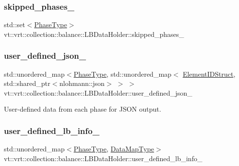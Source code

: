 \subsubsection{\texorpdfstring{skipped\+\_\+phases\+\_\+}{skipped\_phases\_}}
{\footnotesize\ttfamily std\+::set$<$\hyperlink{namespacevt_a46ce6733d5cdbd735d561b7b4029f6d7}{Phase\+Type}$>$ vt\+::vrt\+::collection\+::balance\+::\+L\+B\+Data\+Holder\+::skipped\+\_\+phases\+\_\+}

\mbox{\label{structvt_1_1vrt_1_1collection_1_1balance_1_1_l_b_data_holder_a38dc8aada18756357212f4229ea363da}} 
\subsubsection{\texorpdfstring{user\+\_\+defined\+\_\+json\+\_\+}{user\_defined\_json\_}}
{\footnotesize\ttfamily std\+::unordered\+\_\+map$<$\hyperlink{namespacevt_a46ce6733d5cdbd735d561b7b4029f6d7}{Phase\+Type}, std\+::unordered\+\_\+map$<$ \hyperlink{namespacevt_1_1vrt_1_1collection_1_1balance_a9f5b53fafb270212279a4757d2c4cd28}{Element\+I\+D\+Struct}, std\+::shared\+\_\+ptr$<$nlohmann\+::json$>$ $>$ $>$ vt\+::vrt\+::collection\+::balance\+::\+L\+B\+Data\+Holder\+::user\+\_\+defined\+\_\+json\+\_\+}



User-\/defined data from each phase for J\+S\+ON output. 

\mbox{\label{structvt_1_1vrt_1_1collection_1_1balance_1_1_l_b_data_holder_ad5b8a5a6093c4edd34a10069551c1d19}} 
\subsubsection{\texorpdfstring{user\+\_\+defined\+\_\+lb\+\_\+info\+\_\+}{user\_defined\_lb\_info\_}}
{\footnotesize\ttfamily std\+::unordered\+\_\+map$<$\hyperlink{namespacevt_a46ce6733d5cdbd735d561b7b4029f6d7}{Phase\+Type}, \hyperlink{namespacevt_1_1vrt_1_1collection_1_1balance_a5794b6bc763c88c78228074bd0d1a50f}{Data\+Map\+Type}$>$ vt\+::vrt\+::collection\+::balance\+::\+L\+B\+Data\+Holder\+::user\+\_\+defined\+\_\+lb\+\_\+info\+\_\+}



